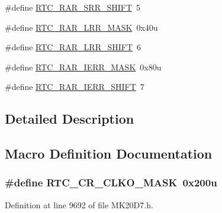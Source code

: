 \begin{DoxyCompactItemize}
$$\item 
\#define \hyperlink{group___r_t_c___register___masks_ga23133dd504a3ee1f1e44adb432cb961a}{R\+T\+C\+\_\+\+R\+A\+R\+\_\+\+S\+R\+R\+\_\+\+S\+H\+I\+FT}~5
\item 
\#define \hyperlink{group___r_t_c___register___masks_ga3ff3b63507d843cbf0c4738aea636510}{R\+T\+C\+\_\+\+R\+A\+R\+\_\+\+L\+R\+R\+\_\+\+M\+A\+SK}~0x40u
\item 
\#define \hyperlink{group___r_t_c___register___masks_gab21813ba6c73f55e69563b0fcfbd0d73}{R\+T\+C\+\_\+\+R\+A\+R\+\_\+\+L\+R\+R\+\_\+\+S\+H\+I\+FT}~6
\item 
\#define \hyperlink{group___r_t_c___register___masks_ga000c148fd3ee9bfbe8f5a96edb4f395d}{R\+T\+C\+\_\+\+R\+A\+R\+\_\+\+I\+E\+R\+R\+\_\+\+M\+A\+SK}~0x80u
\item 
\#define \hyperlink{group___r_t_c___register___masks_gaf3ac1fe81dcd5b54cfe9d8d2125345aa}{R\+T\+C\+\_\+\+R\+A\+R\+\_\+\+I\+E\+R\+R\+\_\+\+S\+H\+I\+FT}~7
\end{DoxyCompactItemize}


\subsection{Detailed Description}


\subsection{Macro Definition Documentation}
\subsubsection[{\texorpdfstring{R\+T\+C\+\_\+\+C\+R\+\_\+\+C\+L\+K\+O\+\_\+\+M\+A\+SK}{RTC_CR_CLKO_MASK}}]{\setlength{\rightskip}{0pt plus 5cm}\#define R\+T\+C\+\_\+\+C\+R\+\_\+\+C\+L\+K\+O\+\_\+\+M\+A\+SK~0x200u}\hypertarget{group___r_t_c___register___masks_ga4c9ab830040b30f5ebc3e21f357e3d58}{}\label{group___r_t_c___register___masks_ga4c9ab830040b30f5ebc3e21f357e3d58}


Definition at line 9692 of file M\+K20\+D7.\+h.

